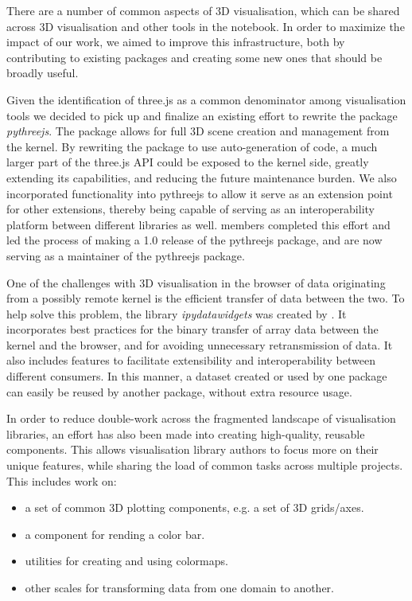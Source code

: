 \documentclass{deliverablereport}
\begin{document}
There are a number of common aspects of 3D visualisation,
which can be shared across 3D visualisation and other tools
in the notebook.
In order to maximize the impact of our work,
we aimed to improve this infrastructure,
both by contributing to existing packages and creating some new ones
that should be broadly useful.

Given the identification of three.js as a common denominator among visualisation tools
we decided to pick up and finalize an existing effort to rewrite the package
\emph{pythreejs}. The package allows for full 3D scene creation and management from the
kernel. By rewriting the package to use auto-generation of code, a much larger
part of the three.js API could be exposed to the kernel side, greatly extending
its capabilities, and reducing the future maintenance burden. We also incorporated
functionality into pythreejs to allow it serve as an extension
point for other extensions, thereby being capable of serving as an interoperability
platform between different libraries as well.
\ODK members completed this effort and led the process of making a 1.0 release of the pythreejs package,
and are now serving as a maintainer of the pythreejs package.

One of the challenges with 3D visualisation in the browser of data originating from
a possibly remote kernel is the efficient transfer of data between the two. To help
solve this problem, the library \emph{ipydatawidgets} was created by \ODK. It incorporates
best practices for the binary transfer of array data between the kernel and the browser,
and for avoiding unnecessary retransmission of data. It also includes features to
facilitate extensibility and interoperability between different consumers. In this
manner, a dataset created or used by one package can easily be reused by another package,
without extra resource usage.

In order to reduce double-work across the fragmented landscape of visualisation
libraries, an effort has also been made into creating high-quality, reusable
components. This allows visualisation library authors to focus more on their
unique features, while sharing the load of common tasks across multiple projects.
This includes work on:

\begin{itemize}
\item a set of common 3D plotting components, e.g. a set of 3D grids/axes.
\item a component for rending a color bar.
\item utilities for creating and using colormaps.
\item other scales for transforming data from one domain to another.
\end{itemize}
\end{document}
